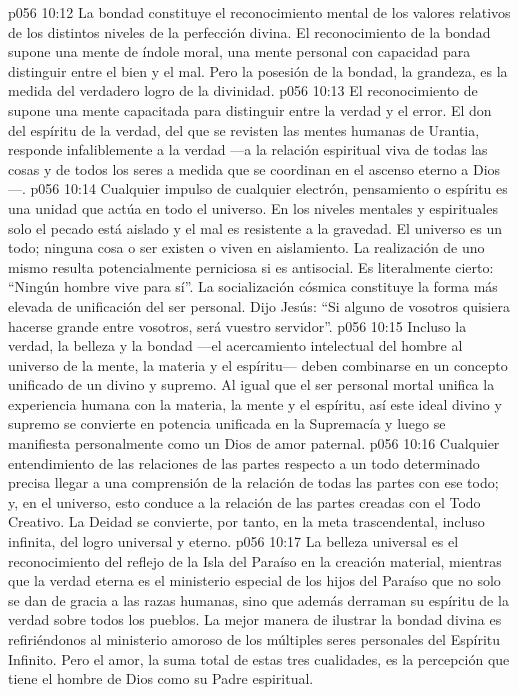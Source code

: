 \vs p056 10:12 La bondad constituye el reconocimiento mental de los valores relativos de los distintos niveles de la perfección divina. El reconocimiento de la bondad supone una mente de índole moral, una mente personal con capacidad para distinguir entre el bien y el mal. Pero la posesión de la bondad, la grandeza, es la medida del verdadero logro de la divinidad.
\vs p056 10:13 \pc El reconocimiento de  supone una mente capacitada para distinguir entre la verdad y el error. El don del espíritu de la verdad, del que se revisten las mentes humanas de Urantia, responde infaliblemente a la verdad ---a la relación espiritual viva de todas las cosas y de todos los seres a medida que se coordinan en el ascenso eterno a Dios---.
\vs p056 10:14 Cualquier impulso de cualquier electrón, pensamiento o espíritu es una unidad que actúa en todo el universo. En los niveles mentales y espirituales solo el pecado está aislado y el mal es resistente a la gravedad. El universo es un todo; ninguna cosa o ser existen o viven en aislamiento. La realización de uno mismo resulta potencialmente perniciosa si es antisocial. Es literalmente cierto: “Ningún hombre vive para sí”. La socialización cósmica constituye la forma más elevada de unificación del ser personal. Dijo Jesús: “Si alguno de vosotros quisiera hacerse grande entre vosotros, será vuestro servidor”.
\vs p056 10:15 Incluso la verdad, la belleza y la bondad ---el acercamiento intelectual del hombre al universo de la mente, la materia y el espíritu--- deben combinarse en un concepto unificado de un  divino y supremo. Al igual que el ser personal mortal unifica la experiencia humana con la materia, la mente y el espíritu, así este ideal divino y supremo se convierte en potencia unificada en la Supremacía y luego se manifiesta personalmente como un Dios de amor paternal.
\vs p056 10:16 Cualquier entendimiento de las relaciones de las partes respecto a un todo determinado precisa llegar a una comprensión de la relación de todas las partes con ese todo; y, en el universo, esto conduce a la relación de las partes creadas con el Todo Creativo. La Deidad se convierte, por tanto, en la meta trascendental, incluso infinita, del logro universal y eterno.
\vs p056 10:17 \pc La belleza universal es el reconocimiento del reflejo de la Isla del Paraíso en la creación material, mientras que la verdad eterna es el ministerio especial de los hijos del Paraíso que no solo se dan de gracia a las razas humanas, sino que además derraman su espíritu de la verdad sobre todos los pueblos. La mejor manera de ilustrar la bondad divina es refiriéndonos al ministerio amoroso de los múltiples seres personales del Espíritu Infinito. Pero el amor, la suma total de estas tres cualidades, es la percepción que tiene el hombre de Dios como su Padre espiritual.
